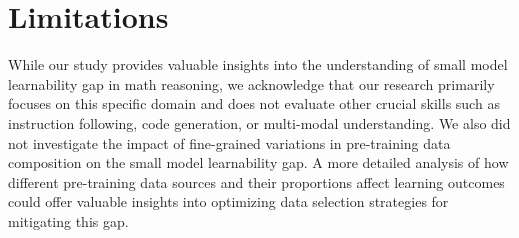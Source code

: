 \section*{Limitations}

While our study provides valuable insights into the understanding of small model learnability gap in math reasoning, we acknowledge that our research primarily focuses on this specific domain and does not evaluate other crucial skills such as instruction following, code generation, or multi-modal understanding. We also did not investigate the impact of fine-grained variations in pre-training data composition on the small model learnability gap. A more detailed analysis of how different pre-training data sources and their proportions affect learning outcomes could offer valuable insights into optimizing data selection strategies for mitigating this gap.
